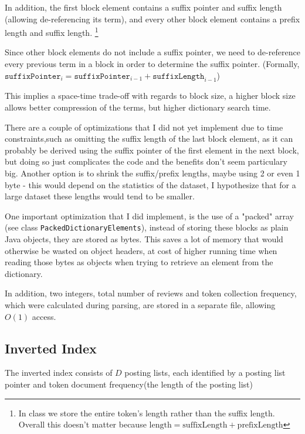 \documentclass[11pt]{article}
\begin{document}
In addition, the first block element contains a suffix pointer and suffix length (allowing de-referencing its term), and every other block element contains a prefix length and suffix length. \footnote{In class we store the entire token's length rather than the suffix length. Overall this doesn't matter because 
	$\text{length} = \text{suffixLength} + \text{prefixLength}$}



Since other block elements do not include a suffix pointer, we need to de-reference every previous term in a block in order to determine the suffix
pointer. (Formally, $\texttt{suffixPointer}_i = \texttt{suffixPointer}_{i-1} + \texttt{suffixLength}_{i-1}$)

This implies a space-time trade-off with regards to block size, a higher block size allows better compression of the terms, but higher dictionary
search time.


There are a couple of optimizations that I did not yet implement due to time constraints,such as omitting the suffix length of the last block element, as it can probably be derived using the suffix pointer of the first element in the next block, but doing so just complicates the code and the benefits don't
seem particulary big. Another option is to shrink the suffix/prefix lengths, maybe using 2 or even 1 byte - this would depend on the statistics of
the dataset, I hypothesize that for a large dataset these lengths would tend to be smaller.


One important optimization that I did implement, is the use of a "packed" array (see class \verb+PackedDictionaryElements+), instead of
storing these blocks as plain Java objects, they are stored as bytes. This saves a lot of memory that would otherwise be wasted on object headers, at
cost of higher running time when reading those bytes as objects when trying to retrieve an element from the dictionary.

In addition, two integers, total number of reviews and token collection frequency, which were calculated during parsing, are stored in a separate file,
allowing $O(1)$ access.

\subsection{Inverted Index}

The inverted index consists of $D$ posting lists, each identified by a posting list pointer
and token document frequency(the length of the posting list)
\end{document}
